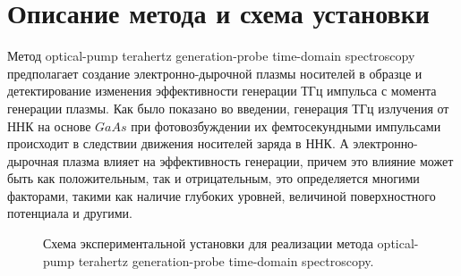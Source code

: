 \documentclass[a4paper,14pt,russian]{extreport}
\begin{document}
		\section{Описание метода и схема установки}\label{installation}
			Метод optical-pump terahertz generation-probe time-domain spectroscopy предполагает создание электронно-дырочной плазмы носителей в образце и детектирование изменения эффективности генерации ТГц импульса с момента генерации плазмы. Как было показано во введении, генерация ТГц излучения от ННК на основе $GaAs$ при фотовозбуждении их фемтосекундными импульсами происходит в следствии движения носителей заряда в ННК. А электронно-дырочная плазма влияет на эффективность генерации, причем это влияние может быть как положительным, так и отрицательным, это определяется многими факторами, такими как наличие глубоких уровней, величиной поверхностного потенциала и другими.\par
				\begin{figure}[h]
					\caption{Схема экспериментальной установки для реализации метода optical-pump terahertz generation-probe time-domain spectroscopy.}
				\label{ris:Scheme}
				\end{figure}
\end{document}
